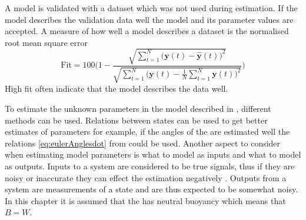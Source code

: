 A model is validated with a dataset which was not used during estimation. If the model describes the validation data well the model and its parameter values are accepted. A measure of how well a model describes a dataset is the normalised root mean square error
\begin{equation}
\text{Fit} = 100 \Biggr(1 - \frac{\sqrt{\sum\limits_{t=1}^N \bigr(\boldsymbol{y}(t) - \hat{\boldsymbol{y}}(t)\bigl)^2}}{\sqrt{\sum\limits_{t=1}^N \bigr(\boldsymbol{y}(t)-\frac{1}{N}\sum\limits_{t=1}^N \boldsymbol{y}(t)\bigl)^2}}\Biggl)
\end{equation} 
High fit often indicate that the model describes the data well.

To estimate the unknown parameters in the \abbrROV model described in , different methods can be used.
Relations between states can be used to get better estimates of parameters for example, if the angles of the \abbrROV are estimated well the relations \eqref{eq:eulerAnglesdot} from  could be used. Another aspect to consider when estimating model parameters is what to model as inputs and what to model as outputs. Inputs to a system are considered to be true signals, thus if they are noisy or inaccurate they can effect the estimation negatively \citep{modellbygge}. Outputs from a system are measurements of a state and are thus expected to be somewhat noisy. In this chapter it is assumed that the \abbrROV has neutral buoyancy which means that $B = W$.

%
%
%

